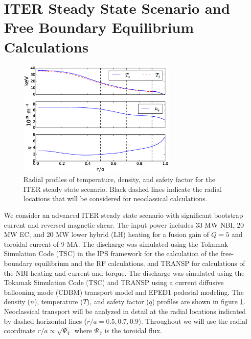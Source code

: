 \documentclass[aip, pop, preprint]{revtex4-1}
\begin{document}
\section{ITER Steady State Scenario and Free Boundary Equilibrium Calculations} \label{vmec}

\FloatBarrier

\begin{figure}[h!]
\centering
\includegraphics[width=0.7\textwidth]{figure1.eps}
\caption{\label{fig:profiles} Radial profiles of temperature, density, and safety factor for the ITER steady state scenario.\cite{Poli2014} Black dashed lines indicate the radial locations that will be considered for neoclassical calculations.}
\end{figure}

We consider an advanced ITER steady state scenario with significant bootstrap current and reversed magnetic shear.\cite{Poli2014} The input power includes 33 MW NBI, 20 MW EC, and 20 MW lower hybrid (LH) heating for a fusion gain of $Q = 5$ and toroidal current of 9 MA. The discharge was simulated using the Tokamak Simulation Code (TSC) in the IPS \cite{Elwasif2010} framework for the calculation of the free-boundary equilibrium and the RF calculations, and TRANSP for calculations of the NBI heating and current and torque. The discharge was simulated using the Tokamak Simulation Code (TSC) \cite{Jardin1986} and TRANSP \cite{Hawryluk1980} using a current diffusive ballooning mode (CDBM) \cite{Fukuyama1995,Fukuyama1998} transport model and EPED1 \cite{Snyder2011} pedestal modeling. The density ($n$), temperature ($T$), and safety factor ($q$) profiles are shown in figure \ref{fig:profiles}. Neoclassical transport will be analyzed in detail at the radial locations indicated by dashed horizontal lines ($r/a = 0.5, 0.7, 0.9$). Throughout we will use the radial coordinate $r/a \propto \sqrt{\Psi_{\mathrm{T}}}$ where $\Psi_{\mathrm{T}}$ is the toroidal flux.
\end{document}
